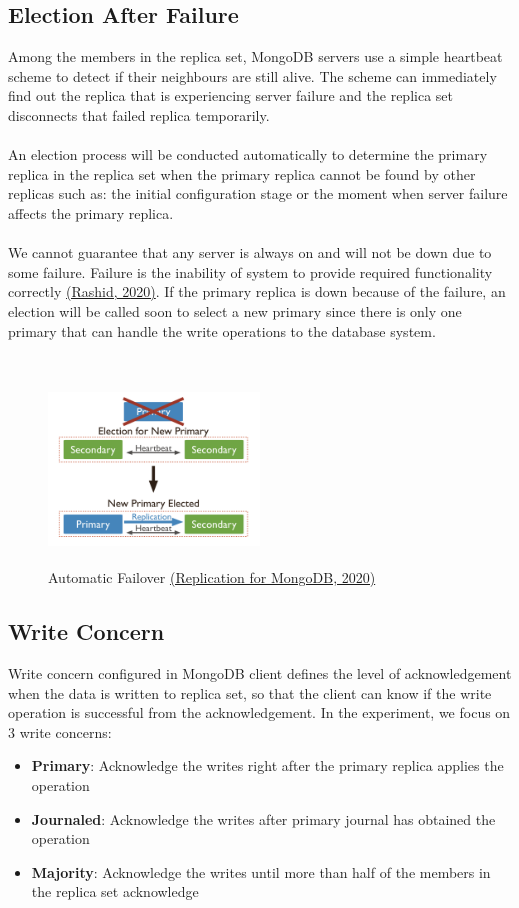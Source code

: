 \documentclass[12pt]{article}
\begin{document}
\subsection{Election After Failure}
Among the members in the replica set, MongoDB servers use a simple heartbeat scheme to detect if their neighbours are still alive. The scheme can immediately find out the replica that is experiencing server failure and the replica set disconnects that failed replica temporarily.\\
\\
An election process will be conducted automatically to determine the primary replica in the replica set when the primary replica cannot be found by other replicas such as: the initial configuration stage or the moment when server failure affects the primary replica.\\
\\
We cannot guarantee that any server is always on and will not be down due to some failure. Failure is the inability of system to provide required functionality correctly \hyperref[sec:reference]{(Rashid, 2020)}. If the primary replica is down because of the failure, an election will be called soon to select a new primary since there is only one primary that can handle the write operations to the database system.\\
\\
\begin{figure}
  \centering
  \includegraphics[width=0.5\textwidth, height=50mm]{img/fail.png}
  \caption{Automatic Failover \hyperref[sec:reference]{(Replication for MongoDB, 2020)}}
  \label{fig:fail}
\end{figure}
\subsection{Write Concern}
Write concern configured in MongoDB client defines the level of acknowledgement when the data is written to replica set, so that the client can know if the write operation is successful from the acknowledgement. In the experiment, we focus on 3 write concerns:\\
\begin{itemize}
  \item \textbf{Primary}: Acknowledge the writes right after the primary replica applies the operation
  \item \textbf{Journaled}: Acknowledge the writes after primary journal has obtained the operation
  \item \textbf{Majority}: Acknowledge the writes until more than half of the members in the replica set acknowledge
\end{itemize}
\end{document}
